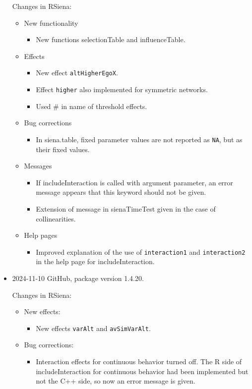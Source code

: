 \documentclass[a4paper,fleqn,11pt]{article}
\newcommand{\+}{\, + \,}
\newcommand{\sfn}[1]{\textsf{#1}}
\begin{document}
\begin{small}
\begin{itemize}
Changes in RSiena:
\begin{itemize}
\item New functionality
   \begin{itemize}
	\item New functions \sfn{selectionTable} and \sfn{influenceTable}.
    \end{itemize}
\item  Effects
   \begin{itemize}
	\item New effect \texttt{altHigherEgoX}.
    \item Effect \texttt{higher} also implemented for symmetric networks.
    \item Used \# in name of threshold effects.
    \end{itemize}
\item Bug corrections
   \begin{itemize}
	\item In \sfn{siena.table},  fixed parameter values are not reported as \texttt{NA},
    but as their fixed values.
    \end{itemize}
\item  Messages
   \begin{itemize}
	\item If \sfn{includeInteraction} is called with argument \sfn{parameter},
    an error message appears that this keyword should not be given.
  \item Extension of message in \sfn{sienaTimeTest} given in the case of
    collinearities.
    \end{itemize}
\item  Help pages
   \begin{itemize}
	\item Improved explanation of the use of \texttt{interaction1} and \texttt{interaction2}
    in the help page for \sfn{includeInteraction}.
    \end{itemize}
\end{itemize}


\item 2024-11-10 GitHub, package version 1.4.20.

Changes in RSiena:
\begin{itemize}
\item New effects:
   \begin{itemize}
	\item New effects \texttt{varAlt} and \texttt{avSimVarAlt}.
    \end{itemize}
\item Bug corrections:
   \begin{itemize}
	\item Interaction effects for continuous behavior turned off. The R side of
	\sfn{includeInteraction} for continuous behavior had been implemented but
	not the C++ side, so now an error message is given.
    \end{itemize}
\end{itemize}


\end{itemize}
\end{small}
\end{document}
